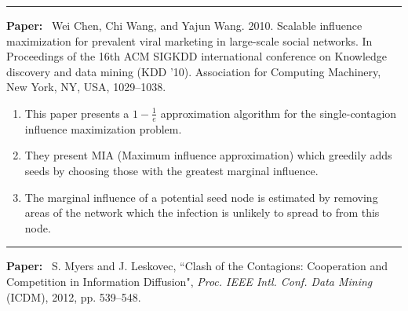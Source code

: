 \documentclass[11pt]{article}
\begin{document}
\noindent
\rule{\textwidth}{0.01in}
\textbf{Paper:}~ Wei Chen, Chi Wang, and Yajun Wang. 2010. Scalable influence maximization for prevalent viral marketing in large-scale social networks. In Proceedings of the 16th ACM SIGKDD international conference on Knowledge discovery and data mining (KDD ’10). Association for Computing Machinery, New York, NY, USA, 1029–1038. 
\begin{enumerate}
    \item This paper presents a $1 - \frac{1}{e}$ approximation algorithm for the single-contagion influence maximization problem.
    \item They present MIA (Maximum influence approximation) which greedily adds seeds by choosing those with the greatest marginal influence.
    \item The marginal influence of a potential seed node is estimated by removing areas of the network which the infection is unlikely to spread to from this node.
    
\end{enumerate}
  

\noindent
\rule{\textwidth}{0.01in}
\textbf{Paper:}~ 
S. Myers and J. Leskovec, ``Clash of the Contagions: Cooperation and
Competition in Information Diffusion", \emph{Proc. IEEE Intl. Conf. Data Mining}
(ICDM), 2012, pp. 539--548.
\end{document}

